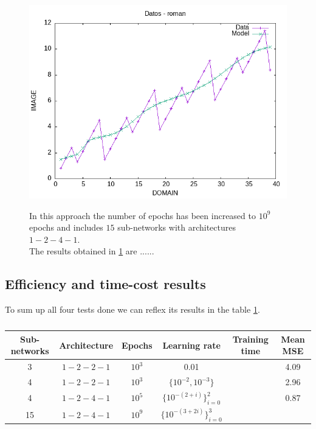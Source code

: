 \documentclass[a4paper, 11pt]{article}
\begin{document}
\begin{figure}[h]
    \begin{minipage}{5.5cm}
        \begin{center}
            \includegraphics[width = 1 \linewidth]{img/roman/roman_third_approach.png}
            \caption{}
            \label{overkill-approach}
        \end{center}
    \end{minipage} \hspace{1em}
    \begin{minipage}{9cm}
        In this approach the number of epochs has been increased to $10^9$ epochs and includes $15$ sub-networks with architectures $1-2-4-1$.\\
        The results obtained in \ref{overkill-approach} are ......
    \end{minipage}
\end{figure}
\subsection{Efficiency and time-cost results}
To sum up all four tests done we can reflex its results in the table \ref{efficiency-table}.
\begin{table}[h]
    \centering
    \begin{tabular}{c|c|c|c|c|c}
        Sub-networks & Architecture & Epochs & Learning rate & Training time & Mean MSE\\\hline\hline
        3 & $1-2-2-1$ & $10^3$ & 0.01 & & 4.09 \\\hline
        4 & $1-2-2-1$ & $10^3$ & $\{10^{-2}, 10^{-3}\}$ & & 2.96 \\\hline
        4 & $1-2-4-1$ & $10^5$ & $\{10^{-(2+i)}\}_{i=0}^{2}$& & 0.87 \\\hline
        15 & $1-2-4-1$ & $10^9$ & $\{10^{-(3+2i)}\}_{i=0}^{3}$& & \\
    \end{tabular}
    \caption{}
    \label{efficiency-table}
\end{table}
\end{document}
